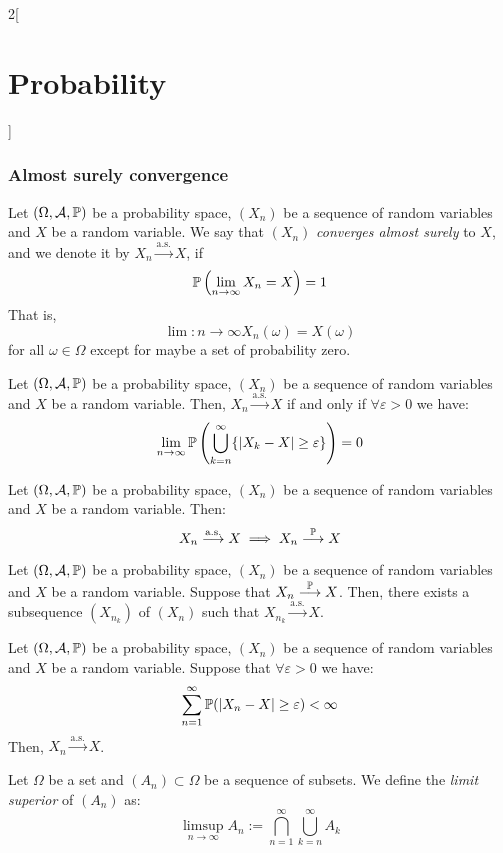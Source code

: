 \documentclass[../../../main.tex]{subfiles}
\begin{document}
\begin{multicols}{2}[\section{Probability}]
    \subsubsection{Almost surely convergence}
    \begin{definition}
        Let $(\Omega,\mathcal{A},\mathbb{P})$ be a probability space, $(X_n)$ be a sequence of random variables and $X$ be a random variable. We say that $(X_n)$ \textit{converges almost surely} to $X$, and we denote it by $X_n\overset{\text{a.s.}}{\longrightarrow} X$, if $$\mathbb{P}\left(\lim_{n\to\infty}X_n=X\right)=1$$ That is, $$\lim:{n\to\infty}X_n(\omega)=X(\omega)$$ for all $\omega\in\Omega$ except for maybe a set of probability zero.
    \end{definition}
    \begin{prop}
        Let $(\Omega,\mathcal{A},\mathbb{P})$ be a probability space, $(X_n)$ be a sequence of random variables and $X$ be a random variable. Then, $X_n\overset{\text{a.s.}}{\longrightarrow} X$ if and only if $\forall \varepsilon>0$ we have: $$\lim_{n\to\infty}\mathbb{P}\left(\bigcup_{k=n}^\infty\{|X_k-X|\geq\varepsilon\}\right)=0$$
    \end{prop}
    \begin{prop}
        Let $(\Omega,\mathcal{A},\mathbb{P})$ be a probability space, $(X_n)$ be a sequence of random variables and $X$ be a random variable. Then:
        $$X_n\overset{\text{a.s.}}{\longrightarrow} X\implies X_n\overset{\mathbb{P}}{\longrightarrow} X$$
    \end{prop}
    \begin{prop}
        Let $(\Omega,\mathcal{A},\mathbb{P})$ be a probability space, $(X_n)$ be a sequence of random variables and $X$ be a random variable. Suppose that $X_n\overset{\mathbb{P}}{\longrightarrow} X$. Then, there exists a subsequence $(X_{n_k})$ of $(X_n)$ such that $X_{n_k}\overset{\text{a.s.}}{\longrightarrow} X$.
    \end{prop}
    \begin{prop}
        Let $(\Omega,\mathcal{A},\mathbb{P})$ be a probability space, $(X_n)$ be a sequence of random variables and $X$ be a random variable. Suppose that $\forall\varepsilon >0$ we have: $$\sum_{n=1}^\infty\mathbb{P}(|X_n-X|\geq\varepsilon)<\infty$$
        Then, $X_n\overset{\text{a.s.}}{\longrightarrow} X$.
    \end{prop}
    \begin{definition}
        Let $\Omega$ be a set and $(A_n)\subset\Omega$ be a sequence of subsets. We define the \textit{limit superior} of $(A_n)$ as: $$\limsup_{n\to\infty}A_n:=\bigcap_{n=1}^\infty\bigcup_{k=n}^\infty A_k$$

\end{definition}
\end{multicols}
\end{document}
